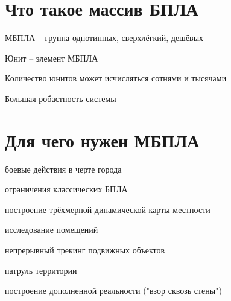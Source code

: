 

\newenvironment{docsec}[1]{%
\section{#1}
\begin{mintemize}
}
{ \end{mintemize} }



\begin{docsec}{Что такое массив БПЛА}
\item МБПЛА -- группа однотипных, сверхлёгкий, дешёвых
\item Юнит -- элемент МБПЛА
\item Количество юнитов может исчисляться сотнями и тысячами
\item Большая робастность системы
\end{docsec}

\begin{docsec}{Для чего нужен МБПЛА}

\item боевые действия в черте города
\item ограничения классических БПЛА

\end{mintemize}

\begin{mintemize}

\item построение трёхмерной динамической карты местности
\item исследование помещений
\item непрерывный трекинг подвижных объектов
\item патруль территории
\item построение дополненной реальности \newline ("взор сквозь стены")

\end{docsec}

